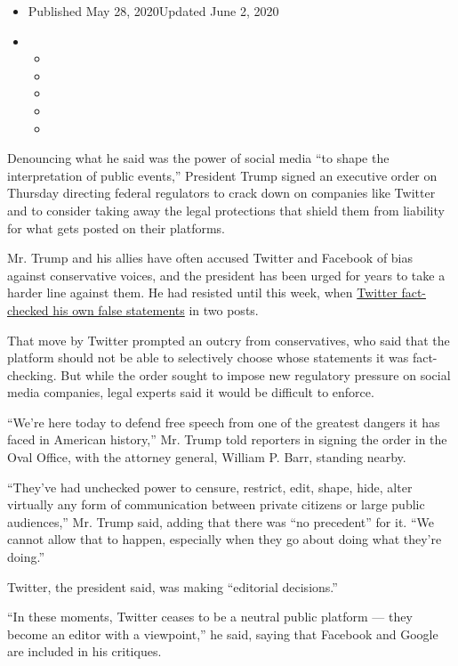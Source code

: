 \begin{itemize}
\item
  Published May 28, 2020Updated June 2, 2020
\item
  \begin{itemize}
  \item
  \item
  \item
  \item
  \item
  \end{itemize}
\end{itemize}

Denouncing what he said was the power of social media ``to shape the
interpretation of public events,'' President Trump signed an executive
order on Thursday directing federal regulators to crack down on
companies like Twitter and to consider taking away the legal protections
that shield them from liability for what gets posted on their platforms.

Mr. Trump and his allies have often accused Twitter and Facebook of bias
against conservative voices, and the president has been urged for years
to take a harder line against them. He had resisted until this week,
when
\href{https://www.nytimes.com/2020/05/26/technology/twitter-trump-mail-in-ballots.html}{Twitter
fact-checked his own false statements} in two posts.

That move by Twitter prompted an outcry from conservatives, who said
that the platform should not be able to selectively choose whose
statements it was fact-checking. But while the order sought to impose
new regulatory pressure on social media companies, legal experts said it
would be difficult to enforce.

``We're here today to defend free speech from one of the greatest
dangers it has faced in American history,'' Mr. Trump told reporters in
signing the order in the Oval Office, with the attorney general, William
P. Barr, standing nearby.

``They've had unchecked power to censure, restrict, edit, shape, hide,
alter virtually any form of communication between private citizens or
large public audiences,'' Mr. Trump said, adding that there was ``no
precedent'' for it. ``We cannot allow that to happen, especially when
they go about doing what they're doing.''

Twitter, the president said, was making ``editorial decisions.''

``In these moments, Twitter ceases to be a neutral public platform ---
they become an editor with a viewpoint,'' he said, saying that Facebook
and Google are included in his critiques.


